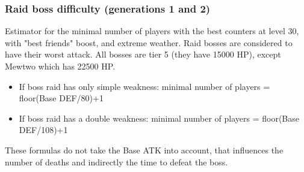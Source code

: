 \documentclass[12pt]{beamer}
\begin{document}
\begin{frame}
\begin{block}{}
\begin{footnotesize}
\begin{center}
\end{center}

\end{footnotesize}
\end{block}
\end{frame}

\begin{frame}
\begin{footnotesize}
\frametitle{Raid boss difficulty (generations 1 and 2)}

\begin{block}{}
Estimator for the minimal number of players with the best counters at level 30, with "best friends" boost, and extreme weather. Raid bosses are considered to have their worst attack. All bosses are tier 5 (they have 15000 HP), except Mewtwo which has 22500 HP.
\begin{itemize}
  \item If boss raid has only simple weakness: minimal number of players = floor(Base DEF/80)+1
  \item If boss raid has a double weakness: minimal number of players = floor(Base DEF/108)+1
\end{itemize}
These formulas do not take the Base ATK into account, that influences the number of deaths and indirectly the time to defeat the boss. 

\medskip


\end{block}
\end{footnotesize}
\end{frame}
\end{document}
